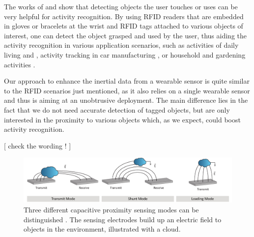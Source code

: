 \documentclass[runningheads,a4paper]{llncs}
\begin{document}
The works of \cite{Fishkin_2005} and \cite{patterson2005fga} show that detecting objects the user touches or uses can be very helpful for activity recognition. By using RFID readers that are embedded in gloves or bracelets at the wrist and RFID tags attached to various objects of interest, one can detect the object grasped and used by the user, thus aiding the activity recognition in various application scenarios, such as activities of daily living \cite{phealth:maja} and \cite{Philipose_2004}, activity tracking in car manufacturing \cite{Stiefmeier08}, or household and gardening activities \cite{berlin_laerhoven_tei_2010}. 

Our approach to enhance the inertial data from a wearable sensor is quite similar to the RFID scenarios just mentioned, as it also relies on a single wearable sensor and thus is aiming at an unobtrusive deployment. The main difference lies in the fact that we do not need accurate detection of tagged objects, but are only interested in the proximity to various objects which, as we expect, could boost activity recognition.

[ check the wording ! ]




\begin{figure}
	\centering
		\includegraphics[width=1.00\textwidth]{Images/modes.pdf}
	\caption{Three different capacitive proximity sensing modes can be distinguished \cite{Smith1996}. The sensing electrodes build up an electric field to objects in the environment, illustrated with a cloud.}
	\label{fig:modes}
\end{figure}
\end{document}
